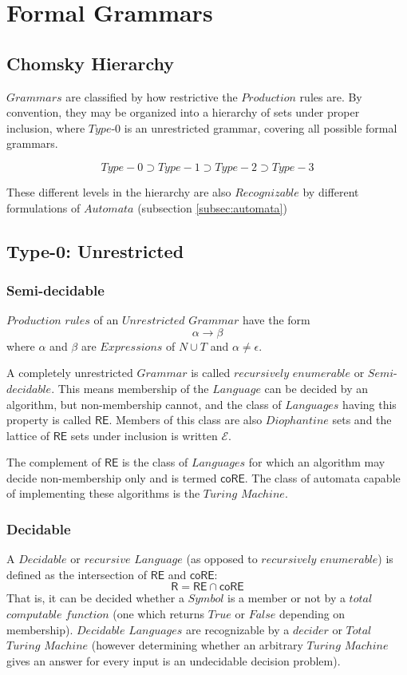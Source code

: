 \documentclass{article}
\begin{document}
\section{Formal Grammars}

\subsection{Chomsky Hierarchy}

$Grammars$ are classified by how restrictive the $Production$ rules
are. By convention, they may be organized into a hierarchy of sets
under proper inclusion, where $Type$-$0$ is an unrestricted grammar,
covering all possible formal grammars.

\[
    Type-0 \supset Type-1 \supset Type-2 \supset Type-3
\]

These different levels in the hierarchy are also $Recognizable$ by
different formulations of $Automata$ (subsection \ref{subsec:automata})

\subsection{Type-0: Unrestricted}

\subsubsection{Semi-decidable}
$Production$ $rules$ of an $Unrestricted$ $Grammar$ have the form
\[
    \alpha \rightarrow \beta
\]
where $\alpha$ and $\beta$ are $Expressions$ of $N \cup T$ and $\alpha
\neq \epsilon$.

A completely unrestricted $Grammar$ is called $recursively$
$enumerable$ or $Semi$-$decidable$. This means membership of the
$Language$ can be decided by an algorithm, but non-membership cannot,
and the class of $Languages$ having this property is called
$\mathsf{RE}$. Members of this class are also $Diophantine$ sets and
the lattice of $\mathsf{RE}$ sets under inclusion is written
$\mathcal{E}$. %

The complement of $\mathsf{RE}$ is the class of $Languages$ for which
an algorithm may decide non-membership only and is termed
$\mathsf{coRE}$. The class of automata capable of implementing these
algorithms is the $Turing$ $Machine$.

\subsubsection{Decidable}
A $Decidable$ or $recursive$ $Language$ (as opposed to $recursively$
$enumerable$) is defined as the intersection of
$\mathsf{RE}$ and $\mathsf{coRE}$:
\[
    \mathsf{R} = \mathsf{RE} \cap \mathsf{coRE}
\]
That is, it can be decided whether a $Symbol$ is a member or not by a
$total$ $computable$ $function$ (one which returns $True$ or $False$
depending on membership). $Decidable$ $Languages$ are recognizable by
a $decider$ or $Total$ $Turing$ $Machine$ (however determining whether
an arbitrary $Turing$ $Machine$ gives an answer for every input is an
undecidable decision problem)\cite{kozen97}.
\end{document}
